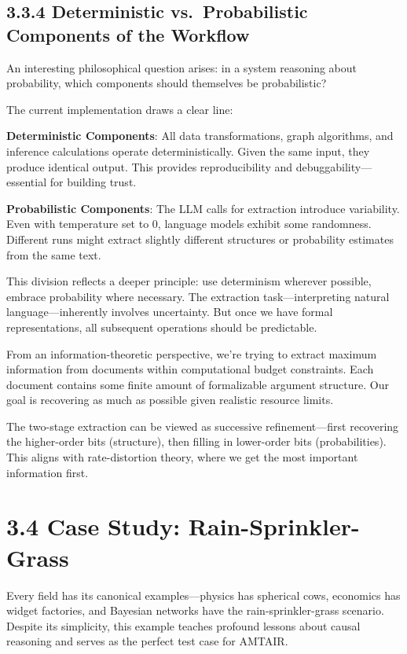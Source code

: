 \documentclass[
  11pt,
  letterpaper,
]{book}
\begin{document}
\subsection{3.3.4 Deterministic vs.~Probabilistic Components of the
Workflow}\label{sec-deterministic-probabilistic}

An interesting philosophical question arises: in a system reasoning
about probability, which components should themselves be probabilistic?

The current implementation draws a clear line:

\textbf{Deterministic Components}: All data transformations, graph
algorithms, and inference calculations operate deterministically. Given
the same input, they produce identical output. This provides
reproducibility and debuggability---essential for building trust.

\textbf{Probabilistic Components}: The LLM calls for extraction
introduce variability. Even with temperature set to 0, language models
exhibit some randomness. Different runs might extract slightly different
structures or probability estimates from the same text.

This division reflects a deeper principle: use determinism wherever
possible, embrace probability where necessary. The extraction
task---interpreting natural language---inherently involves uncertainty.
But once we have formal representations, all subsequent operations
should be predictable.

From an information-theoretic perspective, we're trying to extract
maximum information from documents within computational budget
constraints. Each document contains some finite amount of formalizable
argument structure. Our goal is recovering as much as possible given
realistic resource limits.

The two-stage extraction can be viewed as successive refinement---first
recovering the higher-order bits (structure), then filling in
lower-order bits (probabilities). This aligns with rate-distortion
theory, where we get the most important information first.

\section{3.4 Case Study:
Rain-Sprinkler-Grass}\label{sec-case-rain-sprinkler}

Every field has its canonical examples---physics has spherical cows,
economics has widget factories, and Bayesian networks have the
rain-sprinkler-grass scenario. Despite its simplicity, this example
teaches profound lessons about causal reasoning and serves as the
perfect test case for AMTAIR.
\end{document}
